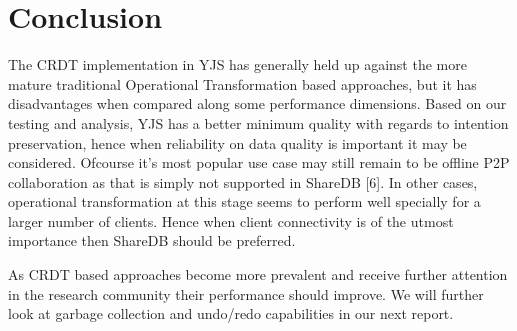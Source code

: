 \documentclass[9pt, titlepage]{article}
\begin{document}
  \break
  \section{Conclusion}
  The CRDT implementation in YJS has generally held up against the more mature traditional Operational Transformation based approaches,
  but it has disadvantages when compared along some performance dimensions.
  Based on our testing and analysis, YJS has a better minimum quality with regards to intention preservation,
  hence when reliability on data quality is important it may be considered.
  Ofcourse it's most popular use case may still remain to be offline P2P collaboration as that is simply not supported in ShareDB [6].
  In other cases, operational transformation at this stage seems to perform well specially for a larger number of clients.
  Hence when client connectivity is of the utmost importance then ShareDB should be preferred.

  As CRDT based approaches become more prevalent and receive further attention in the research community their performance should improve.
  We will further look at garbage collection and undo/redo capabilities in our next report.

  \break
\end{document}
